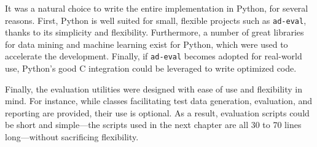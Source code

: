 It was a natural choice to write the entire implementation in Python, for several reasons. First, Python is well suited for small, flexible projects such as \texttt{ad-eval}, thanks to its simplicity and flexibility. Furthermore, a number of great libraries for data mining and machine learning exist for Python, which were used to accelerate the development. Finally, if \texttt{ad-eval} becomes adopted for real-world use, Python's good C integration could be leveraged to write optimized code. 

Finally, the evaluation utilities were designed with ease of use and flexibility in mind. For instance, while classes facilitating test data generation, evaluation, and reporting are provided, their use is optional. As a result, evaluation scripts could be short and simple---the scripts used in the next chapter are all 30 to 70 lines long---without sacrificing flexibility.
